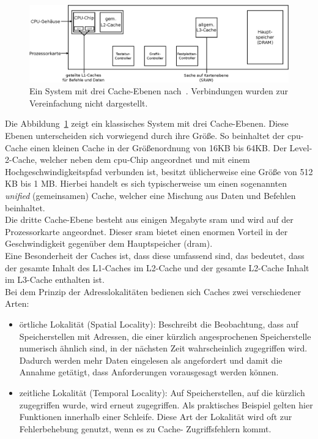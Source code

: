 \begin{figure}[H]
\centering
\includegraphics[width=1\textwidth]{Hauptteil/Cache.eps}
\caption{Ein System mit drei Cache-Ebenen nach~\cite{cache}. Verbindungen wurden zur Vereinfachung nicht dargestellt.}\label{fig:cache}
\end{figure}





Die Abbildung~\ref{fig:cache} zeigt ein klassisches System mit drei Cache-Ebenen. Diese Ebenen unterscheiden sich vorwiegend durch ihre Größe. So beinhaltet der \ac{cpu}-Cache einen kleinen Cache
in der Größenordnung von 16KB bis 64KB. Der Level-2-Cache, welcher neben dem \ac{cpu}-Chip angeordnet und mit einem Hochgeschwindigkeitspfad verbunden ist, besitzt üblicherweise eine Größe von
 512 KB bis 1 MB. Hierbei handelt es sich typischerweise um einen sogenannten \emph{unified} (gemeinsamen) Cache, welcher eine Mischung aus Daten und Befehlen beinhaltet. \\
 Die dritte Cache-Ebene besteht aus einigen Megabyte \ac{sram} und wird auf der Prozessorkarte angeordnet. Dieser \ac{sram} bietet einen enormen Vorteil in der Geschwindigkeit gegenüber dem
 Hauptspeicher (\ac{dram}). \\
 Eine Besonderheit der Caches ist, dass diese umfassend sind, das bedeutet, dass der gesamte Inhalt des L1-Caches im L2-Cache und der gesamte L2-Cache Inhalt im L3-Cache  enthalten ist.\\
\newpage
Bei dem Prinzip der Adresslokalitäten bedienen sich Caches zwei verschiedener Arten:

\begin{itemize}
  \item örtliche Lokalität (Spatial Locality): Beschreibt die Beobachtung, dass auf Speicherstellen mit 	Adressen, die einer kürzlich angesprochenen Speicherstelle numerisch ähnlich sind, in der
   	nächsten Zeit wahrscheinlich zugegriffen wird. Dadurch werden mehr Daten eingelesen als 	angefordert und damit die Annahme getätigt, dass Anforderungen vorausgesagt werden 	können.
  \item zeitliche Lokalität (Temporal Locality): Auf Speicherstellen, auf die kürzlich zugegriffen wurde, 	wird erneut zugegriffen.  Als praktisches Beispiel gelten hier Funktionen innerhalb
        einer Schleife. Diese Art der Lokalität wird oft zur Fehlerbehebung genutzt,  wenn es zu Cache-	Zugriffsfehlern kommt.\\
\end{itemize}

